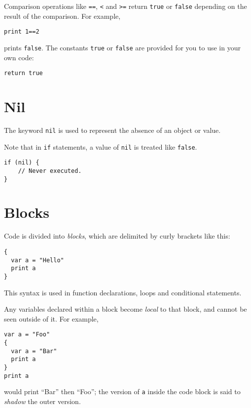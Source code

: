 Comparison operations like \texttt{==}, \texttt{\textless{}} and
\texttt{\textgreater{}=} return \texttt{true} or \texttt{false}
depending on the result of the comparison. For example,

\begin{lstlisting}
print 1==2
\end{lstlisting}

prints \texttt{false}. The constants \texttt{true} or \texttt{false} are
provided for you to use in your own code:

\begin{lstlisting}
return true
\end{lstlisting}

\hypertarget{nil}{%
\section{Nil}\label{nil}}

The keyword \texttt{nil} is used to represent the absence of an object
or value.

Note that in \texttt{if} statements, a value of \texttt{nil} is treated
like \texttt{false}.

\begin{lstlisting}
if (nil) {
    // Never executed.
}
\end{lstlisting}

\hypertarget{blocks}{%
\section{Blocks}\label{blocks}}

Code is divided into \emph{blocks}, which are delimited by curly
brackets like this:

\begin{lstlisting}
{
  var a = "Hello"
  print a
}
\end{lstlisting}

This syntax is used in function declarations, loops and conditional
statements.

Any variables declared within a block become \emph{local} to that block,
and cannot be seen outside of it. For example,

\begin{lstlisting}
var a = "Foo"
{
  var a = "Bar"
  print a
}
print a
\end{lstlisting}

would print ``Bar'' then ``Foo''; the version of \texttt{a} inside the
code block is said to \emph{shadow} the outer version.

